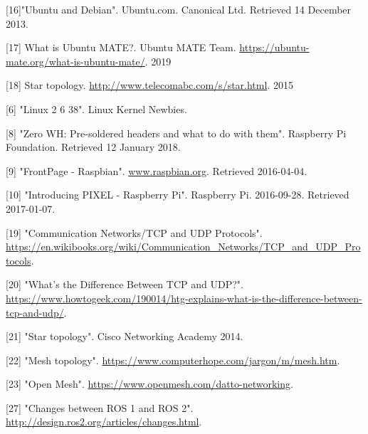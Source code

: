 \documentclass{mproj}
\begin{document}
[16]"Ubuntu and Debian". Ubuntu.com. Canonical Ltd. Retrieved 14 December 2013.

[17] What is Ubuntu MATE?. Ubuntu MATE Team. \url{https://ubuntu-mate.org/what-is-ubuntu-mate/}. 2019 

[18] Star topology. \url{http://www.telecomabc.com/s/star.html}. 2015



[6] "Linux 2 6 38". Linux Kernel Newbies.

[8] "Zero WH: Pre-soldered headers and what to do with them". Raspberry Pi Foundation. Retrieved 12 January 2018.

[9] "FrontPage - Raspbian". \url{www.raspbian.org}. Retrieved 2016-04-04.

[10] "Introducing PIXEL - Raspberry Pi". Raspberry Pi. 2016-09-28. Retrieved 2017-01-07.


[19] "Communication Networks/TCP and UDP Protocols". \url{https://en.wikibooks.org/wiki/Communication_Networks/TCP_and_UDP_Protocols}.

[20] "What’s the Difference Between TCP and UDP?". \url{https://www.howtogeek.com/190014/htg-explains-what-is-the-difference-between-tcp-and-udp/}.

[21] "Star topology". Cisco Networking Academy 2014.

[22] "Mesh topology". \url{https://www.computerhope.com/jargon/m/mesh.htm}.

[23] "Open Mesh". \url{https://www.openmesh.com/datto-networking}.




[27] "Changes between ROS 1 and ROS 2". \url{http://design.ros2.org/articles/changes.html}.
\end{document}
